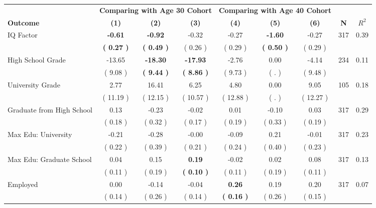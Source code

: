 \begin{tabular}{lcccccccc}
\toprule
 & \multicolumn{3}{c}{\textbf{Comparing with Age 30 Cohort}} & \multicolumn{3}{c}{\textbf{Comparing with Age 40 Cohort}} & \\
\cmidrule(lr){2-4} \cmidrule(lr){5-7} 
 \textbf{Outcome} & \textbf{(1)} & \textbf{(2)} & \textbf{(3)} & \textbf{(4)} & \textbf{(5)} & \textbf{(6)} & \textbf{N} & \textbf{$ R^2$} \\
\midrule
IQ Factor & \textbf{    -0.61} & \textbf{    -0.92} &     -0.32 &     -0.27 & \textbf{    -1.60} &     -0.27 & 317 &       0.39 \\ 
 & \textbf{(     0.27 )} & \textbf{(     0.49 )} & (     0.26 ) & (     0.29 ) & \textbf{(     0.50 )} & (     0.29 ) & \\
High School Grade &    -13.65 & \textbf{   -18.30} & \textbf{   -17.93} &     -2.76 &      0.00 &     -4.14 & 234 &       0.11 \\ 
 & (     9.08 ) & \textbf{(     9.44 )} & \textbf{(     8.86 )} & (     9.73 ) & (        . ) & (     9.48 ) & \\
University Grade &      2.77 &     16.41 &      6.25 &      4.80 &      0.00 &      9.05 & 105 &       0.18 \\ 
 & (    11.19 ) & (    12.15 ) & (    10.57 ) & (    12.88 ) & (        . ) & (    12.27 ) & \\
Graduate from High School &      0.13 &     -0.23 &     -0.02 &      0.01 &     -0.10 &      0.03 & 317 &       0.29 \\ 
 & (     0.18 ) & (     0.32 ) & (     0.17 ) & (     0.19 ) & (     0.33 ) & (     0.19 ) & \\
Max Edu: University &     -0.21 &     -0.28 &     -0.00 &     -0.09 &      0.21 &     -0.01 & 317 &       0.23 \\ 
 & (     0.22 ) & (     0.39 ) & (     0.21 ) & (     0.24 ) & (     0.40 ) & (     0.23 ) & \\
Max Edu: Graduate School &      0.04 &      0.15 & \textbf{     0.19} &     -0.02 &      0.02 &      0.08 & 317 &       0.13 \\ 
 & (     0.11 ) & (     0.19 ) & \textbf{(     0.10 )} & (     0.11 ) & (     0.19 ) & (     0.11 ) & \\
Employed &      0.00 &     -0.14 &     -0.04 & \textbf{     0.26} &      0.19 &      0.20 & 317 &       0.07 \\ 
 & (     0.14 ) & (     0.26 ) & (     0.14 ) & \textbf{(     0.16 )} & (     0.26 ) & (     0.15 ) & \\

\end{tabular}
